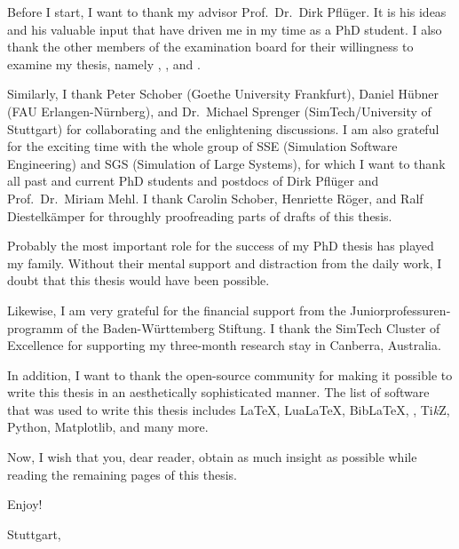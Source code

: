 
Before I start, I want to thank my advisor Prof.\ Dr.\ Dirk Pflüger.
It is his ideas and his valuable input that have driven me in
my time as a PhD student.
I also thank the other members of the
examination board for their willingness to examine my thesis,
namely \theexamineri{}, \theexaminerii{}, and \theexamineriii{}.

Similarly, I thank
Peter Schober (Goethe University Frankfurt),
Daniel Hübner (FAU Erlangen-Nürnberg), and
Dr.\ Michael Sprenger (SimTech/University of Stuttgart) for
collaborating and the enlightening discussions.
I am also grateful for the exciting time with the whole group of
SSE (Simulation Software Engineering) and
SGS (Simulation of Large Systems),
for which I want to thank all past and current PhD students and postdocs of
Dirk Pflüger and Prof.\ Dr.\ Miriam Mehl.
I thank
Carolin Schober,
Henriette Röger, and
Ralf Diestelkämper
for throughly proofreading
parts of drafts of this thesis.

Probably the most important role for the success of my PhD thesis
has played my family.
Without their mental support and distraction from the daily work,
I doubt that this thesis would have been possible.

Likewise, I am very grateful for the financial support from
the \foreignlanguage{ngerman}{Juniorprofessurenprogramm} of the
\foreignlanguage{ngerman}{Baden-Württemberg Stiftung}.
I thank the SimTech Cluster of Excellence for supporting
my three-month research stay in Canberra, Australia.

In addition, I want to thank the open-source community for making it possible to
write this thesis in an aesthetically sophisticated manner.
The list of software that was used to write this thesis includes
\LaTeX, Lua\LaTeX, Bib\LaTeX,
\scalebox{0.9}{\KOMAScript}, Ti\emph{k}Z, Python, Matplotlib,
and many more.

\label{page:preface}
Now, I wish that you, dear reader, obtain as much insight as possible
while reading the remaining
 pages of this thesis.

Enjoy!

\vspace{1em}

\noindent
Stuttgart, \thedate

\noindent
\theauthor

\cleardoublepage
